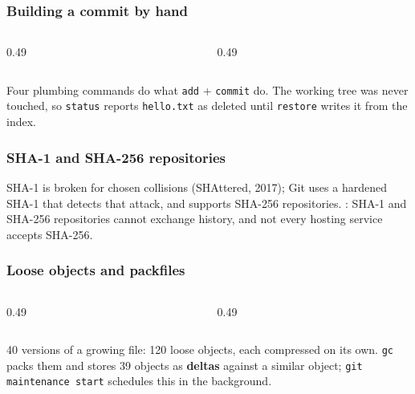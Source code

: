 \documentclass[aspectratio=169,10pt,compress]{beamer}
\begin{document}
\begin{frame}[t,fragile] \frametitle{Building a commit by hand}
  \begin{columns}[T]
    \begin{column}{0.49\textwidth}
    \end{column}
    \begin{column}{0.49\textwidth}
    \end{column}
  \end{columns}

  \vspace{0.1em}
  \small
  Four plumbing commands do what \texttt{add} + \texttt{commit} do. The working tree was never touched, so \texttt{status} reports
  \texttt{hello.txt} as deleted until \texttt{restore} writes it from the index.
\end{frame}




\begin{frame}[t,fragile] \frametitle{SHA-1 and SHA-256 repositories}

  \vspace{0.1em}
  \small
  SHA-1 is broken for chosen collisions (SHAttered, 2017); Git uses a hardened SHA-1 that detects that attack, and supports
  SHA-256 repositories. : SHA-1 and SHA-256 repositories cannot exchange history, and not every hosting service accepts SHA-256.
\end{frame}





\begin{frame}[t,fragile] \frametitle{Loose objects and packfiles}
  \begin{columns}[T]
    \begin{column}{0.49\textwidth}
    \end{column}
    \begin{column}{0.49\textwidth}
    \end{column}
  \end{columns}

  \vspace{0.1em}
  \small
  40 versions of a growing file: 120 loose objects, each compressed on its own. \texttt{gc} packs them and stores
  39 objects as \textbf{deltas} against a similar object; \texttt{git maintenance start} schedules this in the background.
\end{frame}
\end{document}
